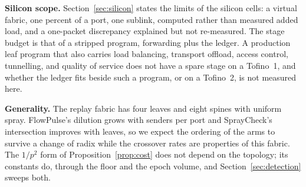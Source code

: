 \textbf{Silicon scope.} Section~\ref{sec:silicon} states the limits of the silicon cells: a virtual fabric, one percent of a port, one sublink, computed rather than measured added load, and a one-packet discrepancy explained but not re-measured. The stage budget is that of a stripped program, forwarding plus the ledger. A production leaf program that also carries load balancing, transport offload, access control, tunnelling, and quality of service does not have a spare stage on a Tofino~1, and whether the ledger fits beside such a program, or on a Tofino~2, is not measured here.

\textbf{Generality.} The replay fabric has four leaves and eight spines with uniform spray. FlowPulse's dilution grows with senders per port and SprayCheck's intersection improves with leaves, so we expect the ordering of the arms to survive a change of radix while the crossover rates are properties of this fabric. The $1/p^2$ form of Proposition~\ref{prop:cost} does not depend on the topology; its constants do, through the floor and the epoch volume, and Section~\ref{sec:detection} sweeps both.
